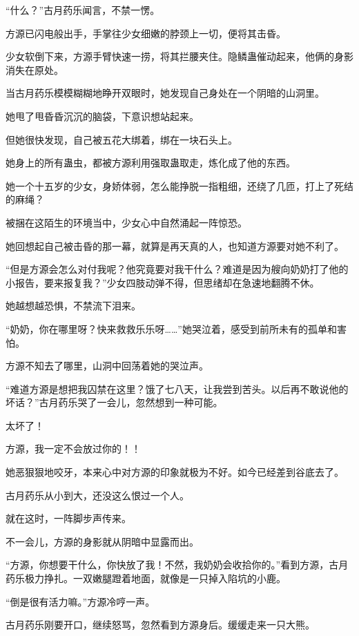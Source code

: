 
\begin{this_body}

“什么？”古月药乐闻言，不禁一愣。

方源已闪电般出手，手掌往少女细嫩的脖颈上一切，便将其击昏。

少女软倒下来，方源手臂快速一捞，将其拦腰夹住。隐鳞蛊催动起来，他俩的身影消失在原处。

当古月药乐模模糊糊地睁开双眼时，她发现自己身处在一个阴暗的山洞里。

她甩了甩昏昏沉沉的脑袋，下意识想站起来。

但她很快发现，自己被五花大绑着，绑在一块石头上。

她身上的所有蛊虫，都被方源利用强取蛊取走，炼化成了他的东西。

她一个十五岁的少女，身娇体弱，怎么能挣脱一指粗细，还绕了几匝，打上了死结的麻绳？

被捆在这陌生的环境当中，少女心中自然涌起一阵惊恐。

她回想起自己被击昏的那一幕，就算是再天真的人，也知道方源要对她不利了。

“但是方源会怎么对付我呢？他究竟要对我干什么？难道是因为艘向奶奶打了他的小报告，要来报复我？”少女四肢动弹不得，但思绪却在急速地翻腾不休。

她越想越恐惧，不禁流下泪来。

“奶奶，你在哪里呀？快来救救乐乐呀……”她哭泣着，感受到前所未有的孤单和害怕。

方源不知去了哪里，山洞中回荡着她的哭泣声。

“难道方源是想把我囚禁在这里？饿了七八天，让我尝到苦头。以后再不敢说他的坏话？”古月药乐哭了一会儿，忽然想到一种可能。

太坏了！

方源，我一定不会放过你的！！

她恶狠狠地咬牙，本来心中对方源的印象就极为不好。如今已经差到谷底去了。

古月药乐从小到大，还没这么恨过一个人。

就在这时，一阵脚步声传来。

不一会儿，方源的身影就从阴暗中显露而出。

“方源，你想要干什么，你快放了我！不然，我奶奶会收拾你的。”看到方源，古月药乐极力挣扎。一双嫩腿蹬着地面，就像是一只掉入陷坑的小鹿。

“倒是很有活力嘛。”方源冷哼一声。

古月药乐刚要开口，继续怒骂，忽然看到方源身后。缓缓走来一只大熊。


\end{this_body}
